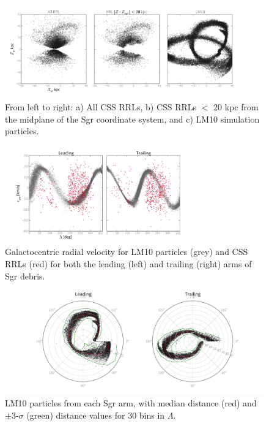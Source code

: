 \documentclass[letterpaper,12pt,preprint]{aastex}
\begin{document}
\begin{figure}
\begin{center}
\includegraphics[width=0.9\textwidth]{catalina_all.pdf}
\caption{ From left to right: a) All CSS RRLs, b) CSS RRLs $<$ 20 kpc from the midplane of the Sgr coordinate system, and c) LM10 simulation particles. }\label{fig:css_all}
\end{center}
\end{figure}

\begin{figure}
\begin{center}
\includegraphics[width=0.75\textwidth]{catalina_all_vgsr.pdf}
\caption{ Galactocentric radial velocity for LM10 particles (grey) and CSS RRLs (red) for both the leading (left) and trailing (right) arms of Sgr debris. }\label{fig:css_vgsr}
\end{center}
\end{figure}

\begin{figure}
\begin{center}
\includegraphics[width=\textwidth]{lm10_selection.pdf}
\caption{ LM10 particles from each Sgr arm, with median distance (red) and $\pm$3-$\sigma$ (green) distance values for 30 bins in $\Lambda$. }\label{fig:lm10_selection}
\end{center}
\end{figure}
\end{document}
